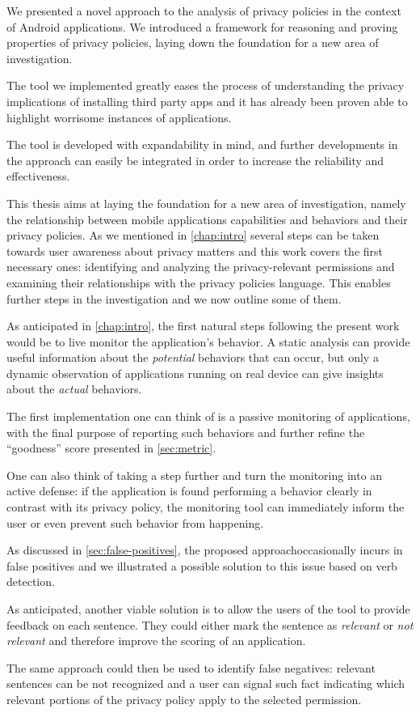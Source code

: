 
We presented a novel approach to the analysis of privacy policies in the context of Android applications. We introduced a framework for reasoning and proving properties of privacy policies, laying down the foundation for a new area of investigation.

The tool we implemented greatly eases the process of understanding the privacy implications of installing third party apps and it has already been proven able to highlight worrisome instances of applications.

The tool is developed with expandability in mind, and further developments in the approach can easily be integrated in order to increase the reliability and effectiveness.

This thesis aims at laying the foundation for a new area of investigation, namely the relationship between mobile applications capabilities and behaviors and their privacy policies. As we mentioned in \autoref{chap:intro} several steps can be taken towards user awareness about privacy matters and this work covers the first necessary ones: identifying and analyzing the privacy-relevant permissions and examining their relationships with the privacy policies language. This enables further steps in the investigation and we now outline some of them.

As anticipated in \autoref{chap:intro}, the first natural steps following the present work would be to live monitor the application's behavior. A static analysis can provide useful information about the \emph{potential} behaviors that can occur, but only a dynamic observation of applications running on real device can give insights about the \emph{actual} behaviors.

The first implementation one can think of is a passive monitoring of applications, with the final purpose of reporting such behaviors and further refine the ``goodness'' score presented in \autoref{sec:metric}.

One can also think of taking a step further and turn the monitoring into an active defense: if the application is found performing a behavior clearly in contrast with its privacy policy, the monitoring tool can immediately inform the user or even prevent such behavior from happening.

As discussed in \autoref{sec:false-positives}, the proposed approachoccasionally incurs in false positives and we illustrated a possible solution to this issue based on verb detection.

As anticipated, another viable solution is to allow the users of the tool to provide feedback on each sentence. They could either mark the sentence as \emph{relevant} or \emph{not relevant} and therefore improve the scoring of an application.

The same approach could then be used to identify false negatives: relevant sentences can be not recognized and a user can signal such fact indicating which relevant portions of the privacy policy apply to the selected permission.